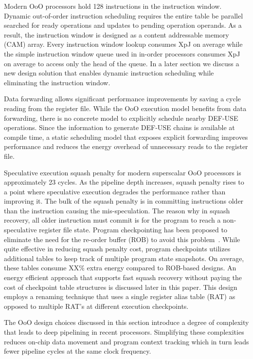Modern OoO processors hold 128 instructions in the instruction window. Dynamic
out-of-order instruction scheduling requires the entire table be parallel
searched for ready operations and updates to pending operation operands. As a
result, the instruction window is designed as a content addressable memory (CAM)
    array. Every instruction window lookup consumes XpJ on average while the
    simple instruction window queue used in in-order processors consumes XpJ on
    average to access only the head of the queue. In a later section we discuss
    a new design solution that enables dynamic instruction scheduling while
    eliminating the instruction window. 

Data forwarding allows significant performance improvements by saving a cycle
reading from the register file. While the OoO execution model benefits from data
forwarding, there is no concrete model to explicitly schedule nearby DEF-USE
operations. Since the information to generate DEF-USE chains is available at
compile time, a static scheduling model that exposes explicit forwarding
improves performance and reduces the energy overhead of unnecessary reads to the
register file.

Speculative execution squash penalty for modern superscalar OoO processors is
approximately 23 cycles. As the pipeline depth increases, squash penalty rises
to a point where speculative execution degrades the performance rather than
improving it. The bulk of the squash penalty is in committing instructions older
than the instruction causing the mis-speculation.  The reason why in squash
recovery, all older instruction must commit is for the program to reach a
non-speculative register file state.  Program checkpointing has been proposed to
eliminate the need for the re-order buffer (ROB) to avoid this
problem~\cite{checkpoint}.  While quite effective in reducing squash penalty
cost, program checkpoints utilizes additional tables to keep track of multiple
program state snapshots.  On average, these tables consume XX\% extra energy
compared to ROB-based designs.  An energy efficient approach that supports fast
squash recovery without paying the cost of checkpoint table structures is
discussed later in this paper. This design employs a renaming technique that
uses a single register alias table (RAT) as opposed to multiple RAT's at
different execution checkpoints.


The OoO design choices discussed in this section introduce a degree of
complexity that leads to deep pipelining in recent processors. Simplifying these
complexities reduces on-chip data movement and program context tracking which in
turn leads fewer pipeline cycles at the same clock frequency.


